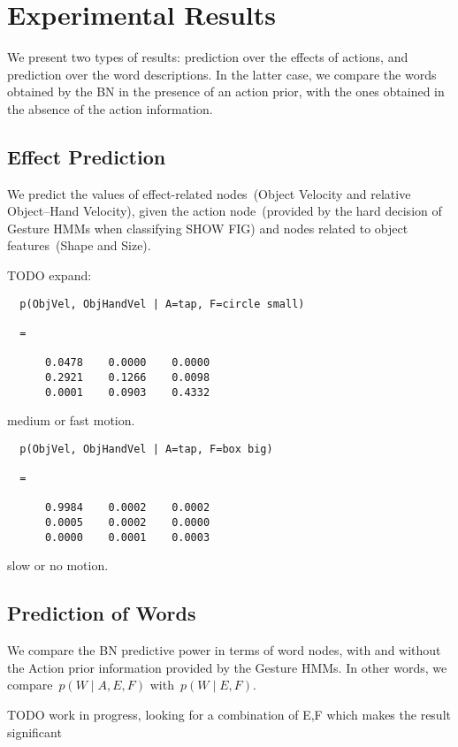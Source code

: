 
\section{Experimental Results}

We present two types of results: prediction over the effects of actions, and prediction over the word descriptions. In the latter case, we compare the words obtained by the \acl{BN} in the presence of an action prior, with the ones obtained in the absence of the action information.

\subsection{Effect Prediction}

We predict the values of effect-related nodes~(Object Velocity and relative Object--Hand Velocity), given the action node~(provided by the hard decision of Gesture \acp{HMM} when classifying SHOW FIG) and nodes related to object features~(Shape and Size).

TODO expand:
\begin{verbatim}
  p(ObjVel, ObjHandVel | A=tap, F=circle small)

  =

      0.0478    0.0000    0.0000
      0.2921    0.1266    0.0098
      0.0001    0.0903    0.4332
\end{verbatim}
\ie medium or fast motion.

\begin{verbatim}
  p(ObjVel, ObjHandVel | A=tap, F=box big)

  =

      0.9984    0.0002    0.0002
      0.0005    0.0002    0.0000
      0.0000    0.0001    0.0003
\end{verbatim}
\ie slow or no motion.

\subsection{Prediction of Words}

We compare the \ac{BN} predictive power in terms of word nodes, with and without the Action prior information provided by the Gesture \acp{HMM}. In other words, we compare~$p(W \mid A, E, F)$ with~$p(W \mid E, F)$.

TODO work in progress, looking for a combination of E,F which makes the result significant
